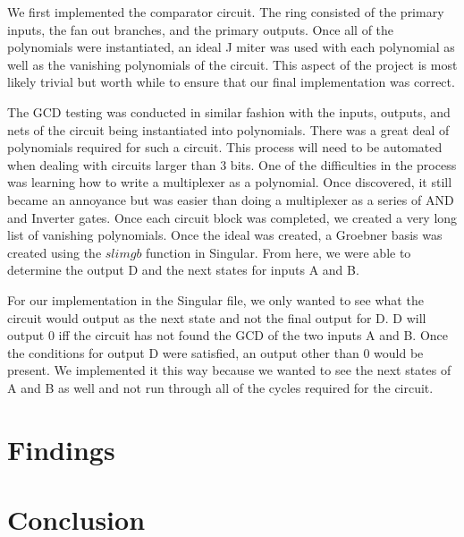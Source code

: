 \documentclass[12pt]{report}
\begin{document}
We first implemented the comparator circuit. The ring consisted of the primary inputs, the fan out branches, and the primary outputs. Once all of the polynomials were instantiated, an ideal J miter was used with each polynomial as well as the vanishing polynomials of the circuit. This aspect of the project is most likely trivial but worth while to ensure that our final implementation was correct. 

The GCD testing was conducted in similar fashion with the inputs, outputs, and nets of the circuit being instantiated into polynomials. There was a great deal of polynomials required for such a circuit. This process will need to be automated when dealing with circuits larger than 3 bits. One of the difficulties in the process was learning how to write a multiplexer as a polynomial. Once discovered, it still became an annoyance but was easier than doing a multiplexer as a series of AND and Inverter gates. Once each circuit block was completed, we created a very long list of vanishing polynomials. Once the ideal was created, a Groebner basis was created using the $slimgb$ function in Singular. From here, we were able to determine the output D and the next states for inputs A and B. 

For our implementation in the Singular file, we only wanted to see what the circuit would output as the next state and not the final output for D. D will output 0 iff the circuit has not found the GCD of the two inputs A and B. Once the conditions for output D were satisfied, an output other than 0 would be present. We implemented it this way because we wanted to see the next states of A and B as well and not run through all of the cycles required for the circuit. 

\section{Findings}

\section{Conclusion}



%
\end{document}
